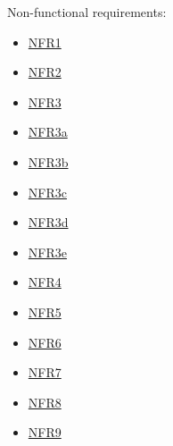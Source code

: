 \documentclass[12pt, titlepage]{article}
\begin{document}
Non-functional requirements:
\begin{itemize}
 \item \hyperref[NFR1]{NFR1}
 \item \hyperref[NFR2]{NFR2}
 \item \hyperref[NFR3]{NFR3}
 \item \hyperref[NFR3a]{NFR3a}
 \item \hyperref[NFR3b]{NFR3b}
 \item \hyperref[NFR3c]{NFR3c}
 \item \hyperref[NFR3d]{NFR3d}
 \item \hyperref[NFR3e]{NFR3e}
 \item \hyperref[NFR4]{NFR4}
 \item \hyperref[NFR5]{NFR5}
 \item \hyperref[NFR6]{NFR6}
 \item \hyperref[NFR7]{NFR7}
 \item \hyperref[NFR8]{NFR8}
 \item \hyperref[NFR9]{NFR9}
\end{itemize}




\end{document}
